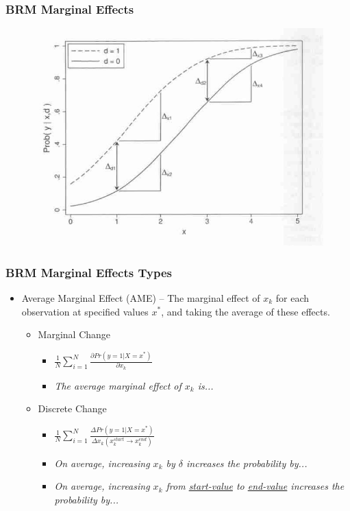 \documentclass{beamer}
\begin{document}
\begin{frame}
	\frametitle{BRM Marginal Effects}
		\begin{figure}[p]
			\centering
			\includegraphics[scale=0.45]{images/brm_marginal_effects.png}
			\label{fig:fig2}
		\end{figure}
\end{frame}

\begin{frame}
	\frametitle{BRM Marginal Effects Types}
		\begin{itemize}
			\item Average Marginal Effect (AME) -- The marginal effect of $x_{k}$ for each observation at specified values $x^{*}$, and taking the average of these effects.
				\begin{itemize}
					\item Marginal Change
						\begin{itemize}
							\item $\frac{1}{N}\sum_{i=1}^{N}\frac{\partial Pr\left(y=1|X=x^{*}\right)}{\partial x_{k}}$
							\item \textit{The average marginal effect of $x_{k}$ is...}
						\end{itemize}
					\item Discrete Change
						\begin{itemize}
							\item $\frac{1}{N}\sum_{i=1}^{N}\frac{\Delta Pr\left(y=1|X=x^{*}\right)}{\Delta x_{k}\left(x^{start}_{k}\rightarrow x^{end}_{k}\right)}$
							\item \textit{On average, increasing $x_{k}$ by $\delta$ increases the probability by...}
							\item \textit{On average, increasing $x_{k}$ from \underline{start-value} to \underline{end-value} increases the probability by...}
						\end{itemize}
				\end{itemize}
		\end{itemize}
\end{frame}
\end{document}
